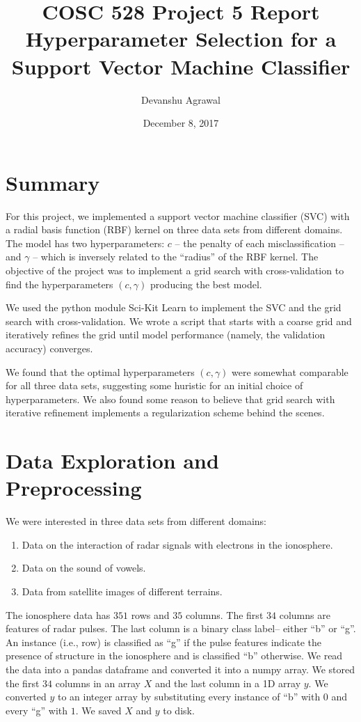 \documentclass[12pt]{article}
\title{COSC 528 Project 5 Report \\
Hyperparameter Selection for a Support Vector Machine Classifier}
\author{Devanshu Agrawal}
\date{December 8, 2017}
\begin{document}
\maketitle

\section{Summary}

For this project, we implemented a support vector machine classifier (SVC) with a radial basis function (RBF) kernel on three data sets from different domains. The model has two hyperparameters: $c$ -- the penalty of each misclassification -- and $\gamma$ -- which is inversely related to the ``radius'' of the RBF kernel. The objective of the project was to implement a grid search with cross-validation to find the hyperparameters $(c, \gamma)$ producing the best model.

We used the python module Sci-Kit Learn to implement the SVC and the grid search with cross-validation. We wrote a script that starts with a coarse grid and iteratively refines the grid until model performance (namely, the validation accuracy) converges.

We found that the optimal hyperparameters $(c, \gamma)$ were somewhat comparable for all three data sets, suggesting some huristic for an initial choice of hyperparameters. We also found some reason to believe that grid search with iterative refinement implements a regularization scheme behind the scenes.


\section{Data Exploration and Preprocessing}

We were interested in three data sets from different domains:
\begin{enumerate}
\item Data on the interaction of radar signals with electrons in the ionosphere.
\item Data on the sound of vowels.
\item Data from satellite images of different terrains.
\end{enumerate}

The ionosphere data has $351$ rows and $35$ columns. The first $34$ columns are features of radar pulses. The last column is a binary class label-- either ``b'' or ``g''. An instance (i.e., row) is classified as ``g'' if the pulse features indicate the presence of structure in the ionosphere and is classified ``b'' otherwise. We read the data into a pandas dataframe and converted it into a numpy array. We stored the first $34$ columns in an array $X$ and the last column in a 1D array $y$. We converted $y$ to an integer array by substituting every instance of ``b'' with $0$ and every ``g'' with $1$. We saved $X$ and $y$ to disk.
\end{document}
